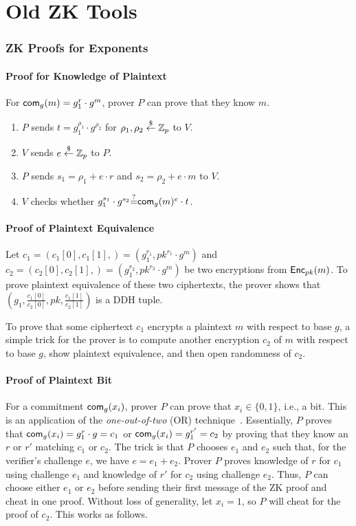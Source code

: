 \section{Old ZK Tools}

\subsubsection{ZK Proofs for Exponents}
\paragraph{Proof for Knowledge of Plaintext}
For $\mathsf{com}_{g}(m)=g_1^r\cdot{}g^m$,  prover $P$ can prove that they know
$m$.

\begin{enumerate}
\item $P$ sends $t=g_1^{\rho_1}\cdot{}g^{\rho_2}$ for
  $\rho_1,\rho_2\stackrel{\$}{\leftarrow}\mathbb{Z}_p$ to $V$.
\item $V$ sends $e\stackrel{\$}{\leftarrow}\mathbb{Z}_p$ to $P$.
  \item $P$ sends $s_1=\rho_1+e\cdot{}r$ and $s_2=\rho_2+e\cdot{}m$ to
    $V$.
    \item $V$ checks whether $g_1^{s_1}\cdot{}g^{s_2}{\stackrel{?}{=}}\mathsf{com}_{g}(m)^e\cdot{}t$.
\end{enumerate}



\paragraph{Proof of Plaintext Equivalence}
Let $c_1=(c_1[0],c_1[1],)=(g_1^{r_1},pk^{r_1}\cdot{}g^m)$ and
$c_2=(c_2[0],c_2[1],)=(g_1^{r_2},pk^{r_2}\cdot{}g^m)$ be two
encryptions from ${\mathsf{Enc}}_{pk}(m)$. To prove plaintext equivalence of
these two ciphertexts, the prover shows that
$(g_1,\frac{c_1[0]}{c_2[0]},pk,\frac{c_1[1]}{c_2[1]})$ is a DDH tuple.

To prove that some ciphertext $c_1$ encrypts a plaintext $m$ with
respect to base $g$, a simple trick for the prover is to compute
another encryption $c_2$ of $m$ with respect to base $g$, show
plaintext equivalence, and then open randomness of $c_2$.


\paragraph{Proof of Plaintext Bit}
For a commitment $\mathsf{com}_g(x_i)$, prover $P$ can prove that
$x_i\in\{0,1\}$, i.e., a bit. This is an application of the
\emph{one-out-of-two} (OR) technique~\cite{ooot}. Essentially, $P$
proves that $\mathsf{com}_g(x_i)=g_1^{r}\cdot{}g=c_1$ or
$\mathsf{com}_g(x_i)=g_1^{r'}=c_2$ by proving that they know an $r$ or $r'$
matching $c_1$ or $c_2$. The trick is that $P$ chooses $e_1$ and $e_2$
such that, for the verifier's challenge $e$, we have
$e=e_1+e_2$. Prover $P$ proves knowledge of $r$ for $c_1$ using
challenge $e_1$ and knowledge of $r'$ for $c_2$ using challenge
$e_2$. Thus, $P$ can choose either $e_1$ or $e_2$ before sending their
first message of the ZK proof and cheat in one proof. Without loss of
generality, let $x_i=1$, so $P$ will cheat for the proof of
$c_2$. This works as follows.

